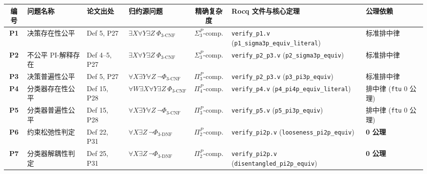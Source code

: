 \documentclass[11pt,a4paper]{article}
\newcommand{\code}[1]{\texttt{\small #1}}
\begin{document}
\begin{center}
\scriptsize
\setlength{\tabcolsep}{4pt}
\begin{tabular}{@{}>{\bfseries}c p{2.2cm} l p{2.9cm} c p{4.6cm} p{2.0cm}@{}}
\toprule
编号 & 问题名称 & 论文出处 & 归约源问题 & 精确复杂度 & Rocq 文件与核心定理 & 公理依赖 \\
\midrule
P1 & 决策存在性公平 & Def 5, P27 & $\exists X\forall Y\exists Z\ \Phi_{\text{3-CNF}}$ & $\Sigma_3^P$-comp. & \code{verify\_p1.v} (\code{p1\_sigma3p\_equiv\_literal}) & 标准排中律 \\
P2 & 不公平 PI-解释存在 & Def 4--5, P27 & $\exists X\forall Y\exists Z\ \Phi_{\text{3-CNF}}$ & $\Sigma_3^P$-comp. & \code{verify\_p2\_p3.v} (\code{p2\_sigma3p\_equiv}) & 标准排中律 \\
P3 & 决策普遍性公平 & Def 5, P27 & $\forall X\exists Y\forall Z\ \neg\Phi_{\text{3-CNF}}$ & $\Pi_3^P$-comp. & \code{verify\_p2\_p3.v} (\code{p3\_pi3p\_equiv}) & 标准排中律 \\
P4 & 分类器存在性公平 & Def 15, P28 & $\forall W\exists X\forall Y\exists Z\ \Phi_{\text{3-CNF}}$ & $\Pi_4^P$-comp. & \code{verify\_p4.v} (\code{p4\_pi4p\_equiv\_literal}) & 排中律 (\code{ftu} 0 公理) \\
P5 & 分类器普遍性公平 & Def 15, P28 & $\forall X\exists Y\forall Z\ \neg\Phi_{\text{3-CNF}}$ & $\Pi_3^P$-comp. & \code{verify\_p5.v} (\code{p5\_pi3p\_equiv}) & 排中律 (\code{ftu} 0 公理) \\
P6 & 约束松弛性判定 & Def 22, P31 & $\forall X\exists Z\ \neg\Phi_{\text{3-DNF}}$ & $\Pi_2^P$-comp. & \code{verify\_pi2p.v} (\code{looseness\_pi2p\_equiv}) & \textbf{0 公理} \\
P7 & 分类器解耦性判定 & Def 25, P31 & $\forall X\exists Z\ \neg\Phi_{\text{3-DNF}}$ & $\Pi_2^P$-comp. & \code{verify\_pi2p.v} (\code{disentangled\_pi2p\_equiv}) & \textbf{0 公理} \\
\bottomrule
\end{tabular}
\end{center}
\end{document}
